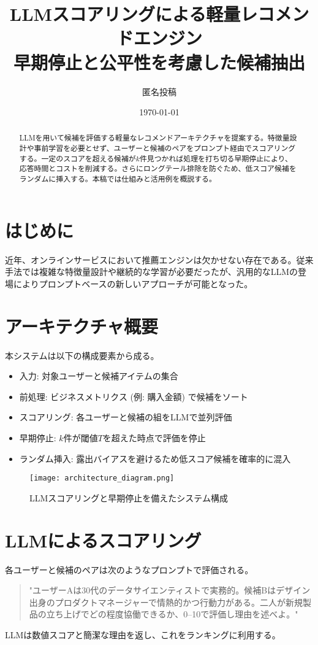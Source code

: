 \documentclass[11pt]{article}
\title{LLMスコアリングによる軽量レコメンドエンジン\\早期停止と公平性を考慮した候補抽出}
\author{匿名投稿}
\date{\today}
\begin{document}
\maketitle

\begin{abstract}
LLMを用いて候補を評価する軽量なレコメンドアーキテクチャを提案する。特徴量設計や事前学習を必要とせず、ユーザーと候補のペアをプロンプト経由でスコアリングする。一定のスコアを超える候補が\(k\)件見つかれば処理を打ち切る早期停止により、応答時間とコストを削減する。さらにロングテール排除を防ぐため、低スコア候補をランダムに挿入する。本稿では仕組みと活用例を概説する。
\end{abstract}

\section{はじめに}
近年、オンラインサービスにおいて推薦エンジンは欠かせない存在である。従来手法では複雑な特徴量設計や継続的な学習が必要だったが、汎用的なLLMの登場によりプロンプトベースの新しいアプローチが可能となった。

\section{アーキテクチャ概要}
本システムは以下の構成要素から成る。
\begin{itemize}
    \item 入力: 対象ユーザーと候補アイテムの集合
    \item 前処理: ビジネスメトリクス (例: 購入金額) で候補をソート
    \item スコアリング: 各ユーザーと候補の組をLLMで並列評価
    \item 早期停止: \(k\)件が閾値\(T\)を超えた時点で評価を停止
    \item ランダム挿入: 露出バイアスを避けるため低スコア候補を確率的に混入
\end{itemize}

\begin{figure}[h!]
    \centering
    \texttt{[image: architecture\_diagram.png]} %
    \caption{LLMスコアリングと早期停止を備えたシステム構成}
\end{figure}

\section{LLMによるスコアリング}
各ユーザーと候補のペアは次のようなプロンプトで評価される。
\begin{quote}
"ユーザーAは30代のデータサイエンティストで実務的。候補Bはデザイン出身のプロダクトマネージャーで情熱的かつ行動力がある。二人が新規製品の立ち上げでどの程度協働できるか、0--10で評価し理由を述べよ。"
\end{quote}
LLMは数値スコアと簡潔な理由を返し、これをランキングに利用する。
\end{document}

